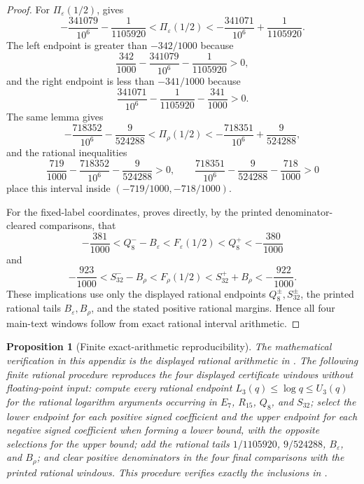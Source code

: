 \documentclass[11pt,a4paper]{amsart}
\theoremstyle{plain}
\newtheorem{proposition}[theorem]{Proposition}
\theoremstyle{definition}
\theoremstyle{remark}
\begin{document}
\begin{proof}
  For \(\Pi_\varepsilon(1/2)\),
   gives
  \[
    -\frac{341079}{10^6}-\frac{1}{1105920}
    <\Pi_\varepsilon(1/2)<
    -\frac{341071}{10^6}+\frac{1}{1105920}.
  \]
  The left endpoint is greater than \(-342/1000\) because
  \[
    \frac{342}{1000}-\frac{341079}{10^6}-\frac{1}{1105920}>0,
  \]
  and the right endpoint is less than \(-341/1000\) because
  \[
    \frac{341071}{10^6}-\frac{1}{1105920}-\frac{341}{1000}>0.
  \]
  The same lemma gives
  \[
    -\frac{718352}{10^6}-\frac{9}{524288}
    <\Pi_\rho(1/2)<
    -\frac{718351}{10^6}+\frac{9}{524288},
  \]
  and the rational inequalities
  \[
    \frac{719}{1000}-\frac{718352}{10^6}-\frac{9}{524288}>0,
    \qquad
    \frac{718351}{10^6}-\frac{9}{524288}-\frac{718}{1000}>0
  \]
  place this interval inside
  \((-719/1000,-718/1000)\).

  For the fixed-label coordinates,
   proves directly, by the printed
  denominator-cleared comparisons, that
  \[
    -\frac{381}{1000}<Q_8^- -B_\varepsilon
    <F_\varepsilon(1/2)<Q_8^+<-\frac{380}{1000}
  \]
  and
  \[
    -\frac{923}{1000}<S_{32}^- -B_\rho
    <F_\rho(1/2)<S_{32}^+ +B_\rho<-\frac{922}{1000}.
  \]
  These implications use only the displayed rational endpoints
  \(Q_8^\pm,S_{32}^\pm\), the printed rational tails
  \(B_\varepsilon,B_\rho\), and the stated positive rational margins.  Hence all
  four main-text windows follow from exact rational interval arithmetic.
\end{proof}

\begin{proposition}[Finite exact-arithmetic reproducibility]
  \label{rem:s3-finite-arithmetic-check}
  \label{prop:s3-finite-arithmetic-reproducibility}
  The mathematical verification in this appendix is the displayed rational
  arithmetic in
  .
  The following finite rational procedure reproduces the four displayed
  certificate windows without floating-point input: compute every rational
  endpoint \(L_3(q)\le\log q\le U_3(q)\) for the rational logarithm arguments
  occurring in \(E_7\), \(R_{15}\), \(Q_8\), and \(S_{32}\); select the lower
  endpoint for each positive signed coefficient and the upper endpoint for each
  negative signed coefficient when forming a lower bound, with the opposite
  selections for the upper bound; add the rational tails
  \(1/1105920\), \(9/524288\), \(B_\varepsilon\), and \(B_\rho\); and clear
  positive denominators in the four final comparisons with the printed
  rational windows.  This procedure verifies exactly the inclusions in
  .
\end{proposition}
\end{document}
